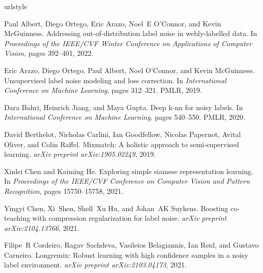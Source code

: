 \documentclass{bmvc2k}
\begin{document}
\begin{thebibliography}{46}
\providecommand{\natexlab}[1]{#1}
\providecommand{\url}[1]{\texttt{#1}}
\expandafter\ifx\csname urlstyle\endcsname\relax
  \providecommand{\doi}[1]{doi: #1}\else
  \providecommand{\doi}{doi: \begingroup \urlstyle{rm}\Url}\fi

Paul Albert, Diego Ortego, Eric Arazo, Noel~E O'Connor, and Kevin McGuinness.
\newblock Addressing out-of-distribution label noise in webly-labelled data.
\newblock In \emph{Proceedings of the IEEE/CVF Winter Conference on
  Applications of Computer Vision}, pages 392--401, 2022.

Eric Arazo, Diego Ortego, Paul Albert, Noel O’Connor, and Kevin McGuinness.
\newblock Unsupervised label noise modeling and loss correction.
\newblock In \emph{International Conference on Machine Learning}, pages
  312--321. PMLR, 2019.

Dara Bahri, Heinrich Jiang, and Maya Gupta.
\newblock Deep k-nn for noisy labels.
\newblock In \emph{International Conference on Machine Learning}, pages
  540--550. PMLR, 2020.

David Berthelot, Nicholas Carlini, Ian Goodfellow, Nicolas Papernot, Avital
  Oliver, and Colin Raffel.
\newblock Mixmatch: A holistic approach to semi-supervised learning.
\newblock \emph{arXiv preprint arXiv:1905.02249}, 2019.

Xinlei Chen and Kaiming He.
\newblock Exploring simple siamese representation learning.
\newblock In \emph{Proceedings of the IEEE/CVF Conference on Computer Vision
  and Pattern Recognition}, pages 15750--15758, 2021.

Yingyi Chen, Xi~Shen, Shell~Xu Hu, and Johan~AK Suykens.
\newblock Boosting co-teaching with compression regularization for label noise.
\newblock \emph{arXiv preprint arXiv:2104.13766}, 2021.

Filipe~R Cordeiro, Ragav Sachdeva, Vasileios Belagiannis, Ian Reid, and Gustavo
  Carneiro.
\newblock Longremix: Robust learning with high confidence samples in a noisy
  label environment.
\newblock \emph{arXiv preprint arXiv:2103.04173}, 2021.


\end{thebibliography}
\end{document}
